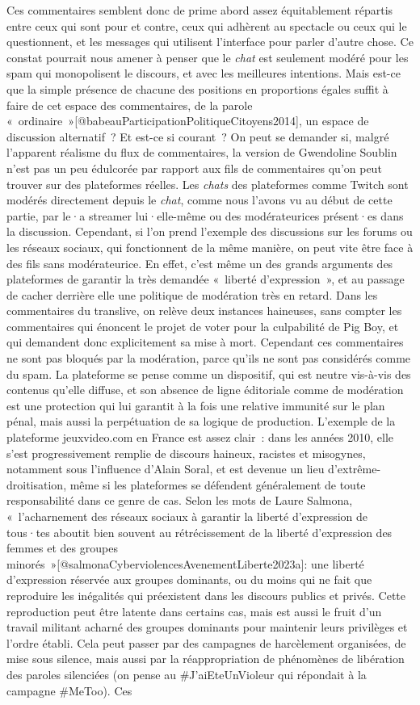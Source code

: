 \documentclass[
]{article}
\begin{document}
Ces commentaires semblent donc de prime abord assez équitablement répartis entre ceux qui sont pour et contre, ceux qui adhèrent au spectacle ou ceux qui le questionnent, et les messages qui utilisent l'interface pour parler d'autre chose. Ce constat pourrait nous amener à penser que le \emph{chat} est seulement modéré pour les spam qui monopolisent le discours, et avec les meilleures intentions. Mais est-ce que la simple présence de chacune des positions en proportions égales suffit à faire de cet espace des commentaires, de la parole «~ordinaire~»{[}@babeauParticipationPolitiqueCitoyens2014{]}, un espace de discussion alternatif~? Et est-ce si courant~? On peut se demander si, malgré l'apparent réalisme du flux de commentaires, la version de Gwendoline Soublin n'est pas un peu édulcorée par rapport aux fils de commentaires qu'on peut trouver sur des plateformes réelles. Les \emph{chats }des plateformes comme Twitch sont modérés directement depuis le \emph{chat}, comme nous l'avons vu au début de cette partie, par le·a streamer lui·elle-même ou des modérateurices présent·es dans la discussion. Cependant, si l'on prend l'exemple des discussions sur les forums ou les réseaux sociaux, qui fonctionnent de la même manière, on peut vite être face à des fils sans modérateurice. En effet, c'est même un des grands arguments des plateformes de garantir la très demandée «~liberté d'expression~», et au passage de cacher derrière elle une politique de modération très en retard. Dans les commentaires du translive, on relève deux instances haineuses, sans compter les commentaires qui énoncent le projet de voter pour la culpabilité de Pig Boy, et qui demandent donc explicitement sa mise à mort. Cependant ces commentaires ne sont pas bloqués par la modération, parce qu'ils ne sont pas considérés comme du spam. La plateforme se pense comme un dispositif, qui est neutre vis-à-vis des contenus qu'elle diffuse, et son absence de ligne éditoriale comme de modération est une protection qui lui garantit à la fois une relative immunité sur le plan pénal, mais aussi la perpétuation de sa logique de production. L'exemple de la plateforme jeuxvideo.com en France est assez clair~: dans les années 2010, elle s'est progressivement remplie de discours haineux, racistes et misogynes, notamment sous l'influence d'Alain Soral, et est devenue un lieu d'extrême-droitisation, même si les plateformes se défendent généralement de toute responsabilité dans ce genre de cas. Selon les mots de Laure Salmona, «~l'acharnement des réseaux sociaux à garantir la liberté d'expression de tous·tes aboutit bien souvent au rétrécissement de la liberté d'expression des femmes et des groupes minorés~»{[}@salmonaCyberviolencesAvenementLiberte2023a{]}: une liberté d'expression réservée aux groupes dominants, ou du moins qui ne fait que reproduire les inégalités qui préexistent dans les discours publics et privés. Cette reproduction peut être latente dans certains cas, mais est aussi le fruit d'un travail militant acharné des groupes dominants pour maintenir leurs privilèges et l'ordre établi. Cela peut passer par des campagnes de harcèlement organisées, de mise sous silence, mais aussi par la réappropriation de phénomènes de libération des paroles silenciées (on pense au \#J'aiEteUnVioleur qui répondait à la campagne \#MeToo). Ces 
\end{document}
